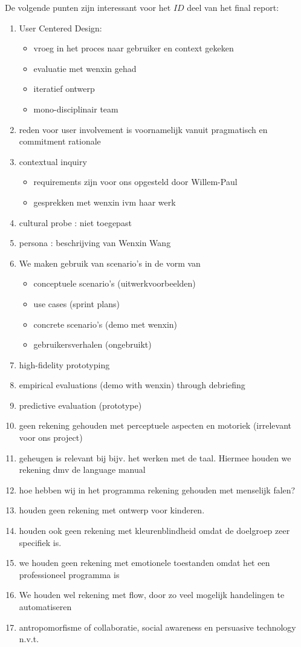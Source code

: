 \documentclass[a4paper]{article}
\begin{document}
De volgende punten zijn interessant voor het $ID$ deel van het final report: 
\begin{enumerate}
\item User Centered Design: \begin{itemize}
	\item vroeg in het proces naar gebruiker en context gekeken
	\item evaluatie met wenxin gehad
	\item iteratief ontwerp
	\item mono-disciplinair team
	\end{itemize}
\item reden voor user involvement is voornamelijk vanuit pragmatisch en commitment rationale
\item contextual inquiry  \begin{itemize}
	\item requirements zijn voor ons opgesteld door Willem-Paul
	\item gesprekken met wenxin ivm haar werk
	\end{itemize}
\item cultural probe : niet toegepast
\item persona : beschrijving van Wenxin Wang
\item We maken gebruik van scenario's in de vorm van \begin{itemize}
	\item conceptuele scenario's (uitwerkvoorbeelden)
	\item use cases (sprint plans)
	\item concrete scenario's (demo met wenxin)
	\item gebruikersverhalen (ongebruikt)
	\end{itemize}
\item high-fidelity prototyping 
\item empirical evaluations (demo with wenxin) through debriefing
\item predictive evaluation (prototype)
\item geen rekening gehouden met perceptuele aspecten en motoriek (irrelevant voor ons project)
\item geheugen is relevant bij bijv. het werken met de taal. Hiermee houden we rekening dmv de language manual
\item hoe hebben wij in het programma rekening gehouden met menselijk falen?
\item houden geen rekening met ontwerp voor kinderen.
\item houden ook geen rekening met kleurenblindheid omdat de doelgroep zeer specifiek is.
\item we houden geen rekening met emotionele toestanden omdat het een professioneel programma is
\item We houden wel rekening met flow, door zo veel mogelijk handelingen te automatiseren
\item antropomorfisme of collaboratie, social awareness en persuasive technology n.v.t.
\end{enumerate}
\end{document}
